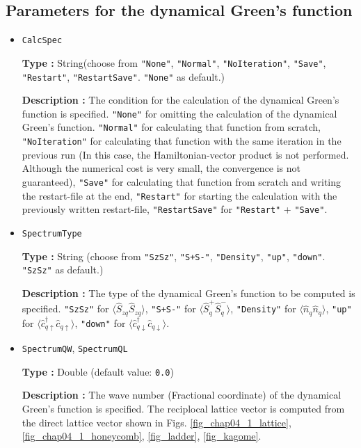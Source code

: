 \subsection{Parameters for the dynamical Green's function}

\begin{itemize}
\item \verb|CalcSpec|
  
  {\bf Type :} String(choose from \verb|"None"|, \verb|"Normal"|, \verb|"NoIteration"|,  
  \verb|"Save"|, \verb|"Restart"|, \verb|"RestartSave"|. \verb|"None"| as default.)

  {\bf Description :} The condition for the calculation of the dynamical
  Green's function is specified.
  \verb|"None"| for omitting the calculation of the
  dynamical Green's function.
  \verb|"Normal"| for calculating that function from scratch,
  \verb|"NoIteration"| for calculating that function
  with the same iteration in the previous run
  (In this case, the Hamiltonian-vector product is not performed.
  Although the numerical cost is very small, the convergence is not guaranteed),
  \verb|"Save"| for calculating that function from scratch
  and writing the restart-file at the end,
  \verb|"Restart"| for starting the calculation with the
  previously written restart-file,
  \verb|"RestartSave"| for \verb|"Restart"| + \verb|"Save"|.
  
\item \verb|SpectrumType|
  
  {\bf Type :} String (choose from \verb|"SzSz"|, \verb|"S+S-"|, \verb|"Density"|,  
  \verb|"up"|, \verb|"down"|. \verb|"SzSz"| as default.)

  {\bf Description :} The type of the dynamical Green's function
  to be computed is specified.
  \verb|"SzSz"| for $\langle {\hat S}_{z q} {\hat S}_{z q}\rangle$,
  \verb|"S+S-"| for $\langle {\hat S}^{+}_{q} {\hat S}^{-}_{q}\rangle$,
  \verb|"Density"| for $\langle {\hat n}_{q} {\hat n}_{q}\rangle$,
  \verb|"up"| for $\langle {\hat c}^{\dagger}_{q \uparrow} {\hat c}_{q \uparrow}\rangle$,
  \verb|"down"| for $\langle {\hat c}^{\dagger}_{q \downarrow} {\hat c}_{q \downarrow}\rangle$.

\item \verb|SpectrumQW|, \verb|SpectrumQL|
  
  {\bf Type :} Double (default value: \verb|0.0|)

  {\bf Description :} The wave number (Fractional coordinate) of the
  dynamical Green's function is specified.
  The reciplocal lattice vector is computed from the
  direct lattice vector shown in Figs.
  \ref{fig_chap04_1_lattice}, \ref{fig_chap04_1_honeycomb},
  \ref{fig_ladder}, \ref{fig_kagome}.


\end{itemize}
